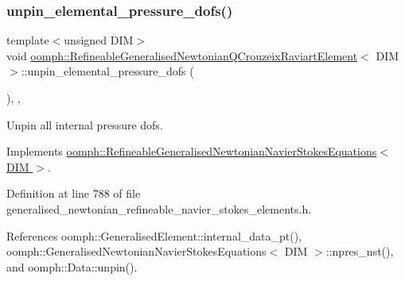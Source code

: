 \subsubsection{\texorpdfstring{unpin\+\_\+elemental\+\_\+pressure\+\_\+dofs()}{unpin\_elemental\_pressure\_dofs()}}
{\footnotesize\ttfamily template$<$unsigned D\+IM$>$ \\
void \hyperlink{classoomph_1_1RefineableGeneralisedNewtonianQCrouzeixRaviartElement}{oomph\+::\+Refineable\+Generalised\+Newtonian\+Q\+Crouzeix\+Raviart\+Element}$<$ D\+IM $>$\+::unpin\+\_\+elemental\+\_\+pressure\+\_\+dofs (\begin{DoxyParamCaption}{ }\end{DoxyParamCaption})\hspace{0.3cm}{\ttfamily [inline]}, {\ttfamily [private]}, {\ttfamily [virtual]}}



Unpin all internal pressure dofs. 



Implements \hyperlink{classoomph_1_1RefineableGeneralisedNewtonianNavierStokesEquations_a5e80fae3c3c4373e082867a49cc78ad0}{oomph\+::\+Refineable\+Generalised\+Newtonian\+Navier\+Stokes\+Equations$<$ D\+I\+M $>$}.



Definition at line 788 of file generalised\+\_\+newtonian\+\_\+refineable\+\_\+navier\+\_\+stokes\+\_\+elements.\+h.



References oomph\+::\+Generalised\+Element\+::internal\+\_\+data\+\_\+pt(), oomph\+::\+Generalised\+Newtonian\+Navier\+Stokes\+Equations$<$ D\+I\+M $>$\+::npres\+\_\+nst(), and oomph\+::\+Data\+::unpin().

\mbox{\label{classoomph_1_1RefineableGeneralisedNewtonianQCrouzeixRaviartElement_a5c5acb0207b889707b138eec04b2b94d}} 
